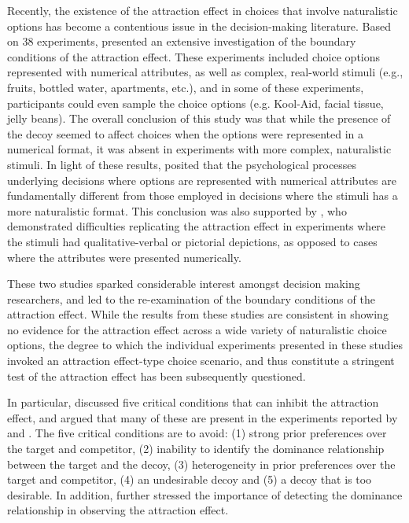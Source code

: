 \documentclass[12pt, a4paper]{article}
\begin{document}
Recently, the existence of the attraction effect in choices that involve naturalistic options has become a contentious issue in the decision-making literature. Based on 38 experiments,  presented an extensive investigation of the boundary conditions of the attraction effect. These experiments included choice options represented with numerical attributes, as well as complex, real-world stimuli (e.g., fruits, bottled water, apartments, etc.), and in some of these experiments, participants could even sample the choice options (e.g. Kool-Aid, facial tissue, jelly beans). The overall conclusion of this study was that while the presence of the decoy seemed to affect choices when the options were represented in a numerical format, it was absent in experiments with more complex, naturalistic stimuli. In light of these results, \citeauthor{Frederick2014} posited that the psychological processes underlying decisions where options are represented with numerical attributes are fundamentally different from those employed in decisions where the stimuli has a more naturalistic format. This conclusion was also supported by , who demonstrated difficulties replicating the attraction effect in experiments where the stimuli had qualitative-verbal or pictorial depictions, as opposed to cases where the attributes were presented numerically.

These two studies sparked considerable interest amongst decision making researchers, and led to the re-examination of the boundary conditions of the attraction effect. While the results from these studies are consistent in showing no evidence for the attraction effect across a wide variety of naturalistic choice options, the degree to which the individual experiments presented in these studies invoked an attraction effect-type choice scenario, and thus constitute a stringent test of the attraction effect has been subsequently questioned.
  
In particular,  discussed five critical conditions that can inhibit the attraction effect, and argued that many of these are present in the experiments reported by  and . The five critical conditions are to avoid: (1) strong prior preferences over the target and competitor, (2) inability to identify the dominance relationship  between the target and the decoy, (3) heterogeneity in prior preferences over the target and competitor, (4) an undesirable decoy and (5) a decoy that is too desirable. In addition,  further stressed the importance of detecting the dominance relationship in observing the attraction effect.
\end{document}
